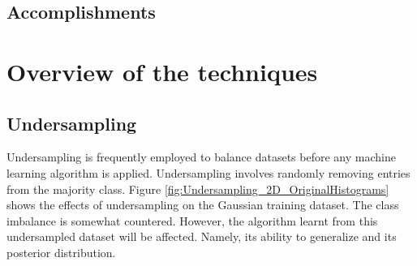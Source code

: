 \documentclass[conference]{IEEEtran}
\begin{document}
	\subsection{Accomplishments}


\section{Overview of the techniques}
	\subsection{Undersampling}
		Undersampling is frequently employed to balance datasets before any machine learning algorithm is applied. Undersampling involves randomly removing entries from the majority class. Figure \ref{fig:Undersampling_2D_OriginalHistograms} shows the effects of undersampling on the Gaussian training dataset. The class imbalance is somewhat countered. However, the algorithm learnt from this undersampled dataset will be affected. Namely, its ability to generalize and its posterior distribution.
\end{document}
